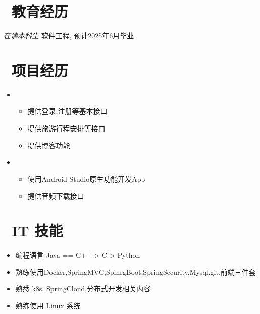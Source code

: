 \documentclass{resume}
\begin{document}



\section{\faGraduationCap\ 教育经历}
\textit{在读本科生} 软件工程, 预计2025年6月毕业
\datedsubsection{\textbf{成绩}}{86 前40\%}

\section{\faUsers\ 项目经历}

\begin{itemize}
  \item {}
        \begin{itemize}
            \item 提供登录,注册等基本接口
            \item 提供旅游行程安排等接口
            \item 提供博客功能
        \end{itemize}
  \item {}
        \begin{itemize}
            \item 使用Android Studio原生功能开发App
            \item 提供音频下载接口
        \end{itemize}
\end{itemize}

\section{\faCogs\ IT 技能}
\begin{itemize}[parsep=0.5ex]
  \item 编程语言 Java == C++ > C > Python
  \item 熟练使用Docker,SpringMVC,SpinrgBoot,SpringSecurity,Mysql,git,前端三件套
  \item 熟悉 k8s, SpringCloud,分布式开发相关内容
  \item 熟练使用 Linux 系统
\end{itemize}
\end{document}
